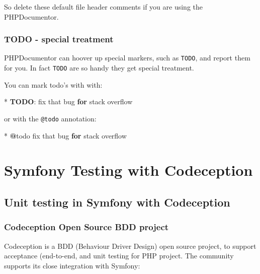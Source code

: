 \documentclass[a4paperpaper,openright]{book}
\newenvironment{Shaded}{}{}
\newcommand{\ErrorTok}[1]{\textcolor[rgb]{1.00,0.00,0.00}{\textbf{#1}}}
\newcommand{\KeywordTok}[1]{\textcolor[rgb]{0.00,0.44,0.13}{\textbf{#1}}}
\newcommand{\NormalTok}[1]{#1}
\begin{document}
So delete these default file header comments if you are using the
PHPDocumentor.

\hypertarget{todo---special-treatment}{%
\section{TODO - special treatment}\label{todo---special-treatment}}

PHPDocumentor can hoover up special markers, such as \texttt{TODO}, and
report them for you. In fact \texttt{TODO} are so handy they get special
treatment.

You can mark todo's with with:

\begin{Shaded}
\begin{Highlighting}[]
\NormalTok{    * }\KeywordTok{TODO}\NormalTok{: fix that bug }\KeywordTok{for}\NormalTok{ stack overflow}
\end{Highlighting}
\end{Shaded}

or with the \texttt{@todo} annotation:

\begin{Shaded}
\begin{Highlighting}[]
\NormalTok{    * }\ErrorTok{@}\NormalTok{todo fix that bug }\KeywordTok{for}\NormalTok{ stack overflow}
\end{Highlighting}
\end{Shaded}

\part{Symfony Testing with Codeception}

\hypertarget{unit-testing-in-symfony-with-codeception}{%
\chapter{Unit testing in Symfony with
Codeception}\label{unit-testing-in-symfony-with-codeception}}

\hypertarget{codeception-open-source-bdd-project}{%
\section{Codeception Open Source BDD
project}\label{codeception-open-source-bdd-project}}

Codeception is a BDD (Behaviour Driver Design) open source project, to
support acceptance (end-to-end, and unit testing for PHP project. The
community supports its close integration with Symfony:
\end{document}
